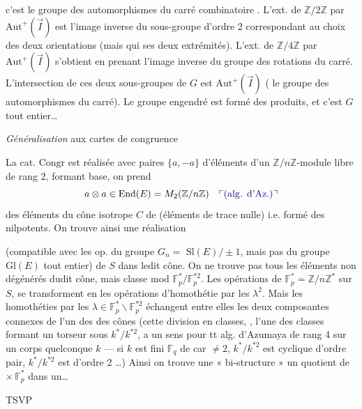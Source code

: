\documentclass[11pt,a4paper]{article}
\begin{document}
c'est le groupe des automorphismes du carré combinatoire . L'ext. de $\mathbb Z/2\mathbb Z$ par $\mathrm{Aut}^+(\vec I)$ est l'image inverse du \struck{\ill{}} sous-groupe d'ordre 2  correspondant au choix des deux orientations (mais qui   ses deux extrémités). L'ext. de $\mathbb Z/4\mathbb Z$ par $\mathrm{Aut}^+(\vec I)$ s'obtient en prenant l'image inverse du groupe des rotations du carré. L'intersection de ces deux sous-groupes de $G$ est $\mathrm{Aut}^+(\vec I)$ (\uncertain{\ill{}} le groupe des automorphismes du carré). Le groupe engendré est formé des produits, et c'est $G$ tout entier…

\emph{Généralisation} aux cartes de congruence

La cat. $\mathrm{Congr}$ est réalisée avec    paires $\{a,-a\}$ d'éléments d'un $\mathbb Z/n\mathbb Z$-module  libre de rang 2, formant base, on prend
\[
a\otimes a \in \mathrm{End}(E) = M_2(\mathbb Z/n\mathbb Z) \quad \text{\add{(alg. d'Az.)}}
\]
 des éléments du cône isotrope $C$ de  (éléments de trace nulle) i.e. formé des nilpotents. On trouve ainsi une réalisation

(compatible avec les op. du groupe $G_n = $  $\mathrm{Sl}(E)/\pm1$, mais pas du groupe $\mathrm{Gl}(E)$ tout entier) de $S$ dans ledit cône. On ne trouve pas tous les éléments non dégénérés dudit cône, mais    classe mod $\mathbb F_p^*/\mathbb F_p^{*2}$. Les opérations de $\mathbb F_p^* = \mathbb Z/n\mathbb Z^*$ sur $S$, se transforment en les opérations d'homothétie par les $\lambda^2$. Mais les homothéties par les $\lambda\in\mathbb F_p^*\smallsetminus\mathbb F_p^{*2}$ échangent entre elles les deux composantes connexes de l'un des    des cônes (cette division en classes, , l'une des classes formant un torseur sous $k^*/k^{*2}$, a un sens pour tt alg. d'Azumaya de rang 4 sur un corps quelconque $k$ — si $k$ est fini \struck{\ill{}} $\mathbb F_q$ de car $\neq 2$, $k^*/k^{*2}$ est cyclique d'ordre pair, $k^*/k^{*2}$ est d'ordre 2 …) Ainsi on trouve une « bi-structure » un quotient de  $\times\,\mathbb F_p^*$ dans un…

TSVP
\end{document}
